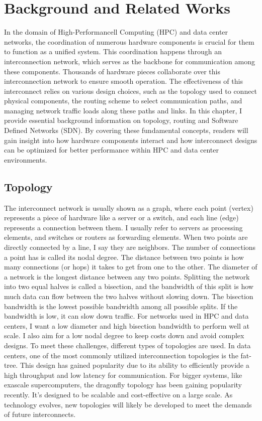 \chapter{Background and Related Works} In the domain of High-Performancell
Computing (HPC) and data center networks, the coordination of numerous hardware
components is crucial for them to function as a unified system. This
coordination happens through an interconnection network, which serves as the
backbone for communication among these components. Thousands of hardware pieces
collaborate over this interconnection network to ensure smooth operation. The
effectiveness of this interconnect relies on various design choices, such as the
topology used to connect physical components, the routing scheme to select
communication paths, and managing network traffic loads along these paths and
links.  In this chapter, I provide essential background information on topology,
routing and Software Defined Networks (SDN). By covering these fundamental
concepts, readers will gain insight into how hardware components interact and
how interconnect designs can be optimized for better performance within HPC and
data center environments.

\section{Topology} The interconnect network is usually shown as a graph, where
each point (vertex) represents a piece of hardware like a server or a switch,
and each line (edge) represents a connection between them. I usually refer to
servers as processing elements, and switches or routers as forwarding elements.
When two points are directly connected by a line, I say they are neighbors. The
number of connections a point has is called its nodal degree. The distance
between two points is how many connections (or hops) it takes to get from one to
the other. The diameter of a network is the longest distance between any two
points.  Splitting the network into two equal halves is called a bisection, and
the bandwidth of this split is how much data can flow between the two halves
without slowing down. The bisection bandwidth is the lowest possible bandwidth
among all possible splits.  If the bandwidth is low, it can slow down traffic.
For networks used in HPC and data centers, I want a low diameter and high
bisection bandwidth to perform well at scale. I also aim for a low nodal degree
to keep costs down and avoid complex designs.  To meet these challenges,
different types of topologies are used. In data centers, one of the most
commonly utilized interconnection topologies is the fat-tree. This design has
gained popularity due to its ability to efficiently provide a high throughput
and low latency for communication. For bigger systems, like exascale
supercomputers, the dragonfly topology has been gaining popularity recently.
It's designed to be scalable and cost-effective on a large scale. As technology
evolves, new topologies will likely be developed to meet the demands of future
interconnects.

